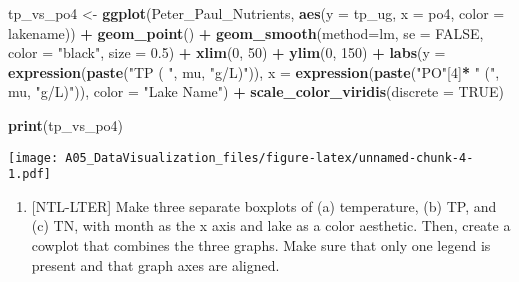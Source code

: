 \documentclass[]{article}
\newenvironment{Shaded}{\begin{snugshade}}{\end{snugshade}}
\newcommand{\DataTypeTok}[1]{\textcolor[rgb]{0.13,0.29,0.53}{#1}}
\newcommand{\DecValTok}[1]{\textcolor[rgb]{0.00,0.00,0.81}{#1}}
\newcommand{\FloatTok}[1]{\textcolor[rgb]{0.00,0.00,0.81}{#1}}
\newcommand{\KeywordTok}[1]{\textcolor[rgb]{0.13,0.29,0.53}{\textbf{#1}}}
\newcommand{\NormalTok}[1]{#1}
\newcommand{\OperatorTok}[1]{\textcolor[rgb]{0.81,0.36,0.00}{\textbf{#1}}}
\newcommand{\OtherTok}[1]{\textcolor[rgb]{0.56,0.35,0.01}{#1}}
\newcommand{\StringTok}[1]{\textcolor[rgb]{0.31,0.60,0.02}{#1}}
\providecommand{\tightlist}{%
  \setlength{\itemsep}{0pt}\setlength{\parskip}{0pt}}
\begin{document}
\begin{Shaded}
\begin{Highlighting}[]
\NormalTok{tp_vs_po4 <-}\StringTok{ }\KeywordTok{ggplot}\NormalTok{(Peter_Paul_Nutrients, }\KeywordTok{aes}\NormalTok{(}\DataTypeTok{y =}\NormalTok{ tp_ug, }\DataTypeTok{x =}\NormalTok{ po4, }\DataTypeTok{color =}\NormalTok{ lakename)) }\OperatorTok{+}
\StringTok{  }\KeywordTok{geom_point}\NormalTok{() }\OperatorTok{+}
\StringTok{  }\KeywordTok{geom_smooth}\NormalTok{(}\DataTypeTok{method=}\NormalTok{lm, }\DataTypeTok{se =} \OtherTok{FALSE}\NormalTok{, }
              \DataTypeTok{color =} \StringTok{"black"}\NormalTok{, }\DataTypeTok{size =} \FloatTok{0.5}\NormalTok{) }\OperatorTok{+}
\StringTok{  }\KeywordTok{xlim}\NormalTok{(}\DecValTok{0}\NormalTok{, }\DecValTok{50}\NormalTok{) }\OperatorTok{+}
\StringTok{  }\KeywordTok{ylim}\NormalTok{(}\DecValTok{0}\NormalTok{, }\DecValTok{150}\NormalTok{) }\OperatorTok{+}
\StringTok{  }\KeywordTok{labs}\NormalTok{(}\DataTypeTok{y =} \KeywordTok{expression}\NormalTok{(}\KeywordTok{paste}\NormalTok{(}\StringTok{"TP ( "}\NormalTok{, mu, }\StringTok{"g/L)"}\NormalTok{)), }
       \DataTypeTok{x =} \KeywordTok{expression}\NormalTok{(}\KeywordTok{paste}\NormalTok{(}\StringTok{"PO"}\NormalTok{[}\DecValTok{4}\NormalTok{]}\OperatorTok{*}\StringTok{ " ("}\NormalTok{, mu, }\StringTok{"g/L)"}\NormalTok{)), }
       \DataTypeTok{color =} \StringTok{"Lake Name"}\NormalTok{) }\OperatorTok{+}
\StringTok{  }\KeywordTok{scale_color_viridis}\NormalTok{(}\DataTypeTok{discrete =} \OtherTok{TRUE}\NormalTok{)}

\KeywordTok{print}\NormalTok{(tp_vs_po4)}
\end{Highlighting}
\end{Shaded}

\texttt{[image: A05\_DataVisualization\_files/figure-latex/unnamed-chunk-4-1.pdf]}

\begin{enumerate}
\def\labelenumi{\arabic{enumi}.}
\setcounter{enumi}{4}
\tightlist
\item
  {[}NTL-LTER{]} Make three separate boxplots of (a) temperature, (b)
  TP, and (c) TN, with month as the x axis and lake as a color
  aesthetic. Then, create a cowplot that combines the three graphs. Make
  sure that only one legend is present and that graph axes are aligned.
\end{enumerate}
\end{document}
